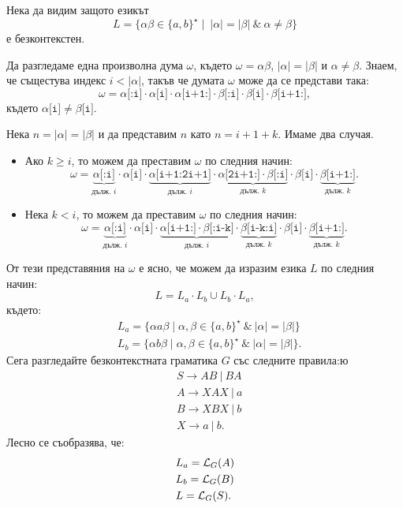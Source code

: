 \begin{example}
  \label{prob:equal-but-different}
  Нека да видим защото езикът
  \[L = \{\alpha\beta \in \{a,b\}^\star \mid\ |\alpha| = |\beta|\ \&\ \alpha \neq \beta\}\]
  е безконтекстен.

  Да разгледаме една произволна дума $\omega$, където $\omega = \alpha\beta$, $|\alpha| = |\beta|$ и $\alpha \neq \beta$.
  Знаем, че същестува индекс $i < |\alpha|$, такъв че думата $\omega$ може да се представи така:
  \[\omega = \alpha\texttt{[:i]} \cdot \alpha\texttt{[i]} \cdot \alpha\texttt{[i+1:]} \cdot \beta\texttt{[:i]} \cdot \beta\texttt{[i]} \cdot \beta\texttt{[i+1:]},\]
  където $\alpha\texttt{[i]} \neq \beta\texttt{[i]}$.

  Нека $n = |\alpha| = |\beta|$ и да представим $n$ като $n = i+1+k$. Имаме два случая.
  \begin{itemize}
  \item
    Ако $k \geq i$, то можем да преставим $\omega$ по следния начин:
    \[\omega = \underbrace{\alpha\texttt{[:i]}}_{\text{дълж. }i} \cdot \alpha\texttt{[i]} \cdot \underbrace{\alpha\texttt{[i+1:2i+1]}}_{\text{дълж. }i} \cdot \underbrace{\alpha\texttt{[2i+1:]} \cdot \beta\texttt{[:i]}}_{\text{дълж. }k} \cdot \beta\texttt{[i]} \cdot \underbrace{\beta\texttt{[i+1:]}}_{\text{дълж. }k}.\]
  \item
    Нека $k < i$, то можем да преставим $\omega$ по следния начин:
    \[\omega = \underbrace{\alpha\texttt{[:i]}}_{\text{дълж. }i} \cdot \alpha\texttt{[i]} \cdot \underbrace{\alpha\texttt{[i+1:]} \cdot \beta\texttt{[:i-k]}}_{\text{дълж. }i} \cdot \underbrace{\beta\texttt{[i-k:i]}}_{\text{дълж. }k} \cdot \beta\texttt{[i]} \cdot \underbrace{\beta\texttt{[i+1:]}}_{\text{дълж. }k}.\]
  \end{itemize}
  От тези представяния на $\omega$ е ясно, че можем да изразим езика $L$ по следния начин:
  \[L = L_a \cdot L_b \cup L_b \cdot L_a,\]
  където:
  \begin{align*}
    & L_a = \{\alpha a \beta \mid \alpha,\beta \in \{a,b\}^\star\ \&\ |\alpha| = |\beta|\}\\
    & L_b = \{\alpha b \beta \mid \alpha,\beta \in \{a,b\}^\star\ \&\ |\alpha| = |\beta|\}.
  \end{align*}
  Сега разгледайте безконтекстната граматика $G$ със следните правила:ю
  \begin{align*}
    & S \to AB\ |\ BA\\
    & A \to XAX\ |\ a\\
    & B \to XBX\ |\ b\\
    & X \to a\ |\ b.
  \end{align*}
  Лесно се съобразява, че:
  \begin{align*}
    & L_a = \mathcal{L}_G(A)\\
    & L_b = \mathcal{L}_G(B)\\
    & L = \mathcal{L}_G(S).
  \end{align*}
\end{example}

